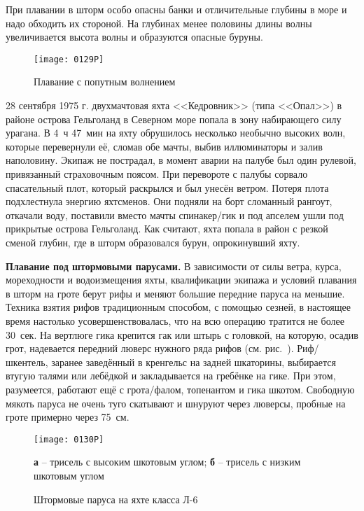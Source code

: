 При плавании в шторм особо опасны банки и отличительные глубины в море и надо обходить их стороной. На глубинах менее половины длины волны увеличивается высота волны и образуются опасные буруны.

\begin{figure*}[htb]
  \centering{}
  \texttt{[image: 0129P]}
  \caption{Плавание с попутным волнением}
  \label{fig:129}
\end{figure*}

{\small 28 сентября 1975 г. двухмачтовая яхта <<Кедровник>> (типа <<Опал>>) в районе острова Гельголанд в Северном море попала в зону набирающего силу урагана. В 4~ч 47~мин на яхту обрушилось несколько необычно высоких волн, которые перевернули её, сломав обе мачты, выбив иллюминаторы и залив наполовину. Экипаж не пострадал, в момент аварии на палубе был один рулевой, привязанный страховочным поясом. При перевороте с палубы сорвало спасательный плот, который раскрылся и был унесён ветром. Потеря плота подхлестнула энергию яхтсменов. Они подняли на борт сломанный рангоут, откачали воду, поставили вместо мачты спинакер\-/гик и под апселем ушли под прикрытые острова Гельголанд. Как считают, яхта попала в район с резкой сменой глубин, где в шторм образовался бурун, опрокинувший яхту.}

\textbf{Плавание под штормовыми парусами.} В зависимости от силы ветра, курса, мореходности и водоизмещения яхты, квалификации экипажа и условий плавания в шторм на гроте берут рифы и меняют большие передние паруса на меньшие. Техника взятия рифов традиционным способом, с помощью сезней, в настоящее время настолько усовершенствовалась, что на всю операцию тратится не более 30~сек. На вертлюге гика крепится гак или штырь с головкой, на которую, осадив грот, надевается передний люверс нужного ряда рифов (см. рис.~). Риф\-/шкентель, заранее заведённый в кренгельс на задней шкаторины, выбирается втугую талями или лебёдкой и закладывается на гребёнке на гике. При этом, разумеется, работают ещё с грота\-/фалом, топенантом и гика шкотом. Свободную мякоть паруса не очень туго скатывают и шнуруют через люверсы, пробные на гроте примерно через 75~см. 

\begin{figure}[htb]
  \centering{}
  \texttt{[image: 0130P]}
  \caption{Штормовые паруса на яхте класса Л-6}
  \label{fig:130}
  \small
  \centering{}
  \textbf{а} \--- трисель с высоким шкотовым углом; \textbf{б} \--- трисель с низким шкотовым углом
\end{figure}

